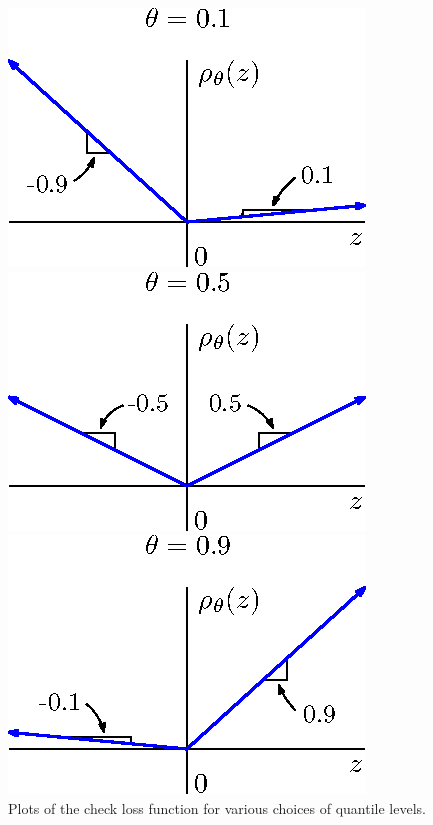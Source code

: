 \begin{figure}[ht]
  \caption[Quantile loss function]{Plots of the check loss function for various
    choices of quantile levels.}
  \label{fig:quantile-loss}
  \vspace{5mm}

  \begin{minipage}[t]{0.33\linewidth}
    \centering
    \includegraphics{check-loss-0-1}
  \end{minipage}
  \begin{minipage}[t]{0.33\linewidth}
    \centering
    \includegraphics{check-loss-0-5}
  \end{minipage}
  \begin{minipage}[t]{0.33\linewidth}
    \centering
    \includegraphics{check-loss-0-9}
  \end{minipage}
  
\end{figure}
